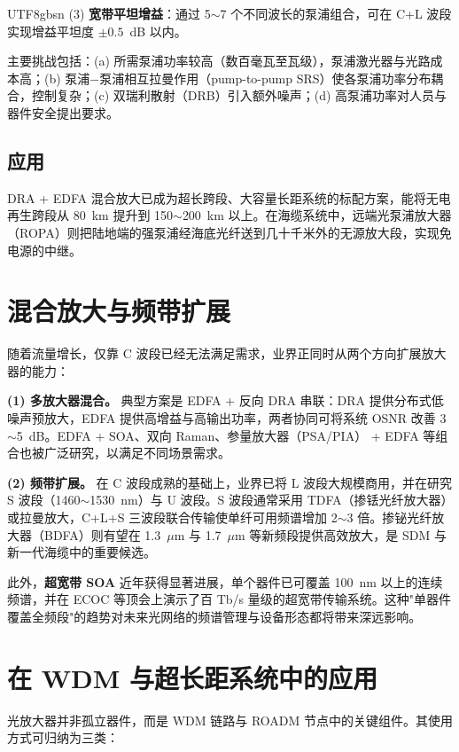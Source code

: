 \documentclass[11pt,a4paper]{article}
\begin{document}
\begin{CJK}{UTF8}{gbsn}
(3) \textbf{宽带平坦增益}：通过 5$\sim$7 个不同波长的泵浦组合，可在 C+L 波段实现增益平坦度 $\pm 0.5$~dB 以内。

主要挑战包括：(a) 所需泵浦功率较高（数百毫瓦至瓦级），泵浦激光器与光路成本高；(b) 泵浦$-$泵浦相互拉曼作用（pump-to-pump SRS）使各泵浦功率分布耦合，控制复杂；(c) 双瑞利散射（DRB）引入额外噪声；(d) 高泵浦功率对人员与器件安全提出要求。

\subsection{应用}

DRA + EDFA 混合放大已成为超长跨段、大容量长距系统的标配方案，能将无电再生跨段从 80~km 提升到 150$\sim$200~km 以上。在海缆系统中，远端光泵浦放大器（ROPA）则把陆地端的强泵浦经海底光纤送到几十千米外的无源放大段，实现免电源的中继。

\section{混合放大与频带扩展}

随着流量增长，仅靠 C 波段已经无法满足需求，业界正同时从两个方向扩展放大器的能力：

\textbf{(1) 多放大器混合。} 典型方案是 EDFA + 反向 DRA 串联：DRA 提供分布式低噪声预放大，EDFA 提供高增益与高输出功率，两者协同可将系统 OSNR 改善 3$\sim$5~dB。EDFA + SOA、双向 Raman、参量放大器（PSA/PIA） + EDFA 等组合也被广泛研究，以满足不同场景需求。

\textbf{(2) 频带扩展。} 在 C 波段成熟的基础上，业界已将 L 波段大规模商用，并在研究 S 波段（1460$\sim$1530~nm）与 U 波段。S 波段通常采用 TDFA（掺铥光纤放大器）或拉曼放大，C+L+S 三波段联合传输使单纤可用频谱增加 2$\sim$3 倍\cite{renaudier2022}。掺铋光纤放大器（BDFA）则有望在 1.3~$\mu$m 与 1.7~$\mu$m 等新频段提供高效放大，是 SDM 与新一代海缆中的重要候选。

此外，\textbf{超宽带 SOA} 近年获得显著进展，单个器件已可覆盖 100~nm 以上的连续频谱，并在 ECOC 等顶会上演示了百 Tb/s 量级的超宽带传输系统\cite{renaudier2022}。这种"单器件覆盖全频段"的趋势对未来光网络的频谱管理与设备形态都将带来深远影响。

\section{在 WDM 与超长距系统中的应用}

光放大器并非孤立器件，而是 WDM 链路与 ROADM 节点中的关键组件。其使用方式可归纳为三类：


\end{CJK}
\end{document}
